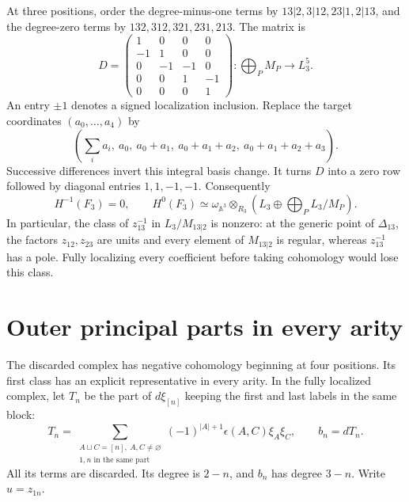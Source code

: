 At three positions, order the degree-minus-one terms by
$13|2,3|12,23|1,2|13$, and the degree-zero terms by
$132,312,321,231,213$. The matrix is
\begin{equation}\label{cycuts:eq:ternary-kernel}
 D=\begin{pmatrix}
 1&0&0&0\\-1&1&0&0\\0&-1&-1&0\\0&0&1&-1\\0&0&0&1
 \end{pmatrix}:
 \bigoplus_P M_P\longrightarrow L_3^5.
\end{equation}
An entry $\pm1$ denotes a signed localization inclusion. Replace
the target coordinates $(a_0,\ldots,a_4)$ by
\[
 \left(\sum_i a_i,\ a_0,\ a_0+a_1,\ a_0+a_1+a_2,
                                  \ a_0+a_1+a_2+a_3\right).
\]
Successive differences invert this integral basis change. It turns
$D$ into a zero row followed by diagonal entries $1,1,-1,-1$.
Consequently
\begin{equation}\label{cycuts:eq:ternary-cohomology}
 H^{-1}(F_3)=0,\qquad
 H^0(F_3)\simeq\omega_{\mathbb A^3}\otimes_{R_3}
       \left(L_3\oplus\bigoplus_P L_3/M_P\right).
\end{equation}
In particular, the class of $z_{13}^{-1}$ in $L_3/M_{13|2}$ is
nonzero: at the generic point of $\Delta_{13}$, the factors
$z_{12},z_{23}$ are units and every element of $M_{13|2}$ is
regular, whereas $z_{13}^{-1}$ has a pole. Fully localizing every
coefficient before taking cohomology would lose this class.

\section{Outer principal parts in every arity}
\label{cycuts:sec:outer}

The discarded complex has negative cohomology beginning at four
positions. Its first class has an explicit representative in every
arity. In the fully localized complex, let $T_n$ be the part of
$d\xi_{[n]}$ keeping the first and last labels in the same block:
\begin{equation}\label{cycuts:eq:Tn}
 T_n=\sum_{\substack{A\sqcup C=[n],\ A,C\ne\varnothing\\
                         1,n\text{ in the same part}}}
       (-1)^{|A|+1}\epsilon(A,C)\xi_A\xi_C,
 \qquad b_n=dT_n.
\end{equation}
All its terms are discarded. Its degree is $2-n$, and $b_n$ has
degree $3-n$. Write $u=z_{1n}$.

